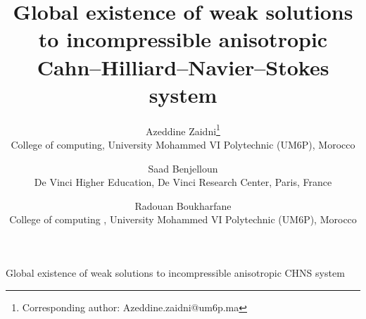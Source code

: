 \documentclass[11pt]{article}
\begin{document}
{Global existence of weak solutions to incompressible anisotropic CHNS system}

%

\title{Global existence of weak solutions to incompressible anisotropic Cahn--Hilliard--Navier--Stokes system}

\author{
Azeddine Zaidni\thanks{Corresponding author: Azeddine.zaidni@um6p.ma} \\
College of computing, University Mohammed VI Polytechnic (UM6P), Morocco
\and
Saad Benjelloun \\
De Vinci Higher Education, De Vinci Research Center, Paris, France
\and
Radouan Boukharfane \\
College of computing , University Mohammed VI Polytechnic (UM6P), Morocco
}
\end{document}
